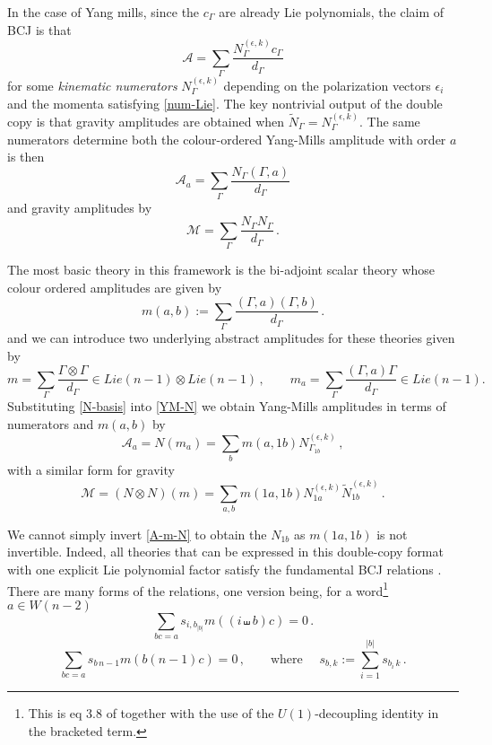 \documentclass[11pt]{article}
\newcommand{\cA}{\mathcal{A}}
\newcommand{\cM}{\mathcal{M}}
\newcommand{\1}{{\rm 1\hskip-0.25em I}}
\begin{document}
In the case of Yang mills, since the $c_\Gamma$ are already Lie polynomials, the claim of BCJ \cite{Bern:2008qj} is that
\begin{equation}
\cA=\sum_\Gamma\frac{N_\Gamma^{(\epsilon,k)} c_\Gamma}{d_\Gamma}
\end{equation}
for some \emph{kinematic numerators} $N_\Gamma^{(\epsilon,k)}$ depending on the polarization vectors $\epsilon_i$ and the momenta satisfying \eqref{num-Lie}.  The key nontrivial output of the double copy is that gravity amplitudes are obtained  when $\tilde N_\Gamma=N_\Gamma^{(\epsilon,k)}$. The same numerators determine both 
the colour-ordered Yang-Mills amplitude with order $a$ is then
\begin{equation}
\cA_a = \sum_\Gamma \frac{N_\Gamma (\Gamma,a)}{d_\Gamma }\label{YM-N}
\end{equation}
and gravity amplitudes by
\begin{equation}
\cM = \sum_\Gamma \frac{N_\Gamma N_\Gamma}{d_\Gamma }\, .
\end{equation}



The most basic theory in this framework is the bi-adjoint scalar theory whose colour ordered amplitudes are given by
\begin{equation}
m(a,b):=\sum_\Gamma \frac{(\Gamma,a)(\Gamma,b)}{d_\Gamma}\, .
\end{equation}
and we can introduce two underlying abstract amplitudes for these theories given by
\begin{equation}
m=\sum_\Gamma \frac{\Gamma\otimes \Gamma}{d_\Gamma}\in Lie(n-1)\otimes Lie(n-1) \,, \qquad m_a=\sum_\Gamma\frac{(\Gamma,a)\Gamma}{d_\Gamma}\in Lie(n-1) .
\end{equation}
Substituting \eqref{N-basis} into \eqref{YM-N} we obtain Yang-Mills amplitudes in terms of numerators and $m(a,b)$ by
\begin{equation}
\cA_a=N(m_a)=\sum_b m(a,1b) N_{\Gamma_{1b}}^{(\epsilon,k)}\, ,\label{A-m-N}
\end{equation}
with a similar form for gravity
\begin{equation}
\cM=(N\otimes N)(m) =\sum_{a,b} m(1a,1b)N_{1a}^{(\epsilon,k)}\tilde N_{1b}^{(\epsilon,k)}\,.
\end{equation} 



We cannot simply invert \eqref{A-m-N} to obtain the $N_{1b}$ as $m(1a,1b)$ is not invertible. Indeed, 
all theories that can be expressed in this double-copy format with one explicit Lie polynomial factor satisfy the fundamental BCJ relations \cite{Bern:2008qj}.  There are many forms of the relations,  one version being, for a word\footnote{This is eq 3.8 of \cite{Cachazo:2012} together with the use of the $U(1)$-decoupling identity in the bracketed term.} $a\in W(n-2)$
\begin{equation}
\sum_{bc=a} s_{i,b_{|b|}} m((i\shuffle b)c)  =0\, .
\end{equation}
\begin{equation}
\sum_{bc=a}s_{b\,n-1} m(b (n-1) c)=0\, , \qquad \mbox{where } \quad s_{b, k}:=\sum_{i=1}^{|b|} s_{b_i\, k}\, .
\end{equation}
\end{document}
